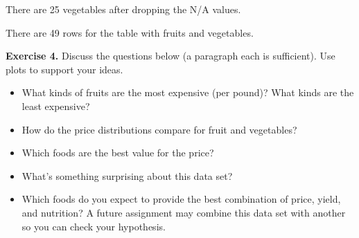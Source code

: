 \documentclass[11pt]{article}
\providecommand{\tightlist}{%
      \setlength{\itemsep}{0pt}\setlength{\parskip}{0pt}}
\begin{document}
    There are 25 vegetables after dropping the N/A values.

There are 49 rows for the table with fruits and vegetables.

    \textbf{Exercise 4.} Discuss the questions below (a paragraph each is
sufficient). Use plots to support your ideas.

\begin{itemize}
\tightlist
\item
  What kinds of fruits are the most expensive (per pound)? What kinds
  are the least expensive?
\item
  How do the price distributions compare for fruit and vegetables?
\item
  Which foods are the best value for the price?
\item
  What's something surprising about this data set?
\item
  Which foods do you expect to provide the best combination of price,
  yield, and nutrition? A future assignment may combine this data set
  with another so you can check your hypothesis.
\end{itemize}
\end{document}
